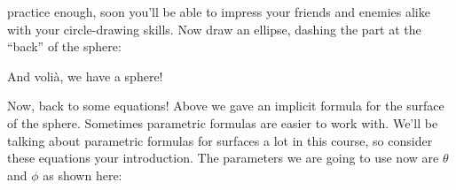 \documentclass{ximera}
\begin{document}
practice enough, soon you'll be able to impress your friends and
enemies alike with your circle-drawing skills.  Now draw an ellipse,
dashing the part at the ``back'' of the sphere:
\begin{image}
\end{image}
And voli\`a, we have a sphere!

Now, back to some equations!  Above we gave an implicit formula for the surface of the
sphere. Sometimes parametric formulas are easier to work with. We'll be
talking about parametric formulas for surfaces a lot in this
course, so consider these equations your introduction. 
The parameters we are going to use now are $\theta$ and $\phi$ as shown here:
\end{document}
